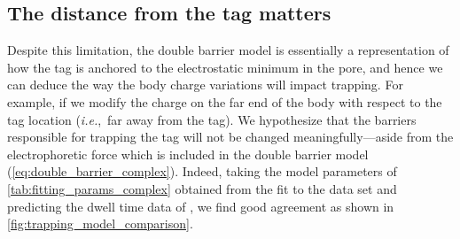 \begin{figure*}[p]
  \caption[Effect of body and tag charge on the dwell time of {DHFR}.]
  {%
    \textbf{Effect of body and tag charge on the dwell time of {DHFR}.}
    () Predicted dwell times of the body charge variations
     by \cref{eq:double_barrier} and using the parameters in
    \cref{tab:fitting_params_complex}. Clearly, the location of the body charge plays an important, but
    uncaptured, role in determining the dwell time of \gls{dhfr}.
    ()
    and
    ()
    are the voltage dependencies of the mean dwell time ($\dwelltime$) for several tag charge variants of
    , fitted with the simple barrier model of \cref{eq:double_barrier_simple} and the full
    double barrier model of \cref{eq:double_barrier_complex}, respectively. The annotated threshold voltages
    for () and
    () were computed by respectively
    \cref{eq:threshold_voltage_simple} and \cref{eq:threshold_voltage_complex}. Solid lines represent the
    double barrier dwell time while the dotted lines show the dwell times due the \cisi{} (low to high) and
    \transi{} (high to low) barriers. Fitting parameters can be found in \cref{tab:fitting_parameters_simple}.
    }\label{fig:trapping_model_comparison}
\end{figure*}
%


\subsection{The distance from the tag matters}
%

Despite this limitation, the double barrier model is essentially a representation of how the tag is anchored
to the electrostatic minimum in the pore, and hence we can deduce the way the body charge variations will
impact trapping. For example, if we modify the charge on the far end of the body with respect to the tag
location (\textit{i.e.},~far away from the tag). We hypothesize that the barriers responsible for trapping the
tag will not be changed meaningfully---aside from the electrophoretic force which is included in the double
barrier model (\cref{eq:double_barrier_complex}). Indeed, taking the model parameters of
\cref{tab:fitting_params_complex} obtained from the fit to the  data set and predicting the
dwell time data of , we find good agreement as shown in
\cref{fig:trapping_model_comparison}.

